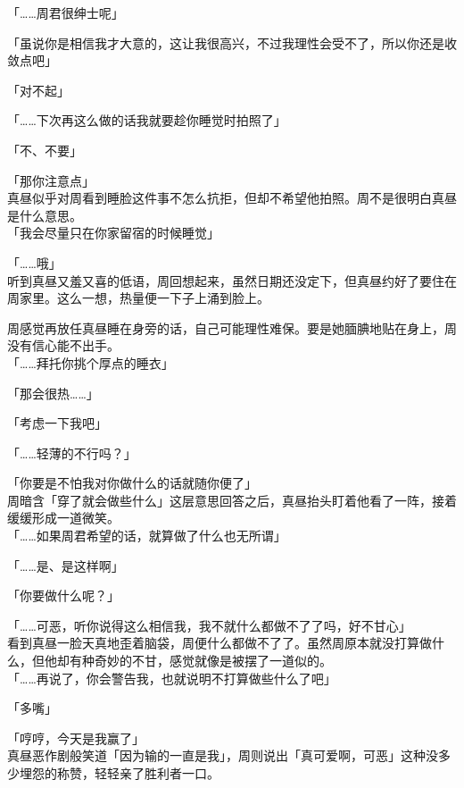 「……周君很绅士呢」

「虽说你是相信我才大意的，这让我很高兴，不过我理性会受不了，所以你还是收敛点吧」

「对不起」

「……下次再这么做的话我就要趁你睡觉时拍照了」

「不、不要」

「那你注意点」\\

真昼似乎对周看到睡脸这件事不怎么抗拒，但却不希望他拍照。周不是很明白真昼是什么意思。\\

「我会尽量只在你家留宿的时候睡觉」

「……哦」\\

听到真昼又羞又喜的低语，周回想起来，虽然日期还没定下，但真昼约好了要住在周家里。这么一想，热量便一下子上涌到脸上。

周感觉再放任真昼睡在身旁的话，自己可能理性难保。要是她腼腆地贴在身上，周没有信心能不出手。\\

「……拜托你挑个厚点的睡衣」

「那会很热……」

「考虑一下我吧」

「……轻薄的不行吗？」

「你要是不怕我对你做什么的话就随你便了」\\

周暗含「穿了就会做些什么」这层意思回答之后，真昼抬头盯着他看了一阵，接着缓缓形成一道微笑。\\

「……如果周君希望的话，就算做了什么也无所谓」

「……是、是这样啊」

「你要做什么呢？」

「……可恶，听你说得这么相信我，我不就什么都做不了了吗，好不甘心」\\

看到真昼一脸天真地歪着脑袋，周便什么都做不了了。虽然周原本就没打算做什么，但他却有种奇妙的不甘，感觉就像是被摆了一道似的。\\

「……再说了，你会警告我，也就说明不打算做些什么了吧」

「多嘴」

「哼哼，今天是我赢了」\\

真昼恶作剧般笑道「因为输的一直是我」，周则说出「真可爱啊，可恶」这种没多少埋怨的称赞，轻轻亲了胜利者一口。

